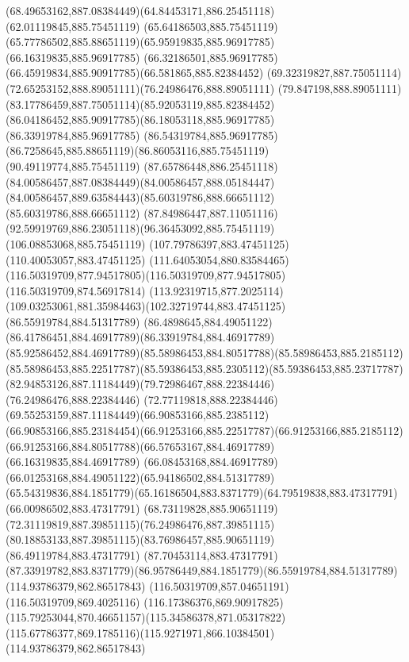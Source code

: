 {{\curveto(68.49653162,887.08384449)(64.84453171,886.25451118)(62.01119845,885.75451119)
\lineto(65.64186503,885.75451119)
\curveto(65.77786502,885.88651119)(65.95919835,885.96917785)(66.16319835,885.96917785)
\curveto(66.32186501,885.96917785)(66.45919834,885.90917785)(66.581865,885.82384452)
\curveto(69.32319827,887.75051114)(72.65253152,888.89051111)(76.24986476,888.89051111)
\curveto(79.847198,888.89051111)(83.17786459,887.75051114)(85.92053119,885.82384452)
\curveto(86.04186452,885.90917785)(86.18053118,885.96917785)(86.33919784,885.96917785)
\curveto(86.54319784,885.96917785)(86.7258645,885.88651119)(86.86053116,885.75451119)
\lineto(90.49119774,885.75451119)
\curveto(87.65786448,886.25451118)(84.00586457,887.08384449)(84.00586457,888.05184447)
\curveto(84.00586457,889.63584443)(85.60319786,888.66651112)(85.60319786,888.66651112)
\curveto(87.84986447,887.11051116)(92.59919769,886.23051118)(96.36453092,885.75451119)
\lineto(106.08853068,885.75451119)
\lineto(107.79786397,883.47451125)
\lineto(110.40053057,883.47451125)
\curveto(111.64053054,880.83584465)(116.50319709,877.94517805)(116.50319709,877.94517805)
\lineto(116.50319709,874.56917814)
\curveto(113.92319715,877.2025114)(109.03253061,881.35984463)(102.32719744,883.47451125)
\moveto(86.55919784,884.51317789)
\curveto(86.4898645,884.49051122)(86.41786451,884.46917789)(86.33919784,884.46917789)
\curveto(85.92586452,884.46917789)(85.58986453,884.80517788)(85.58986453,885.2185112)
\curveto(85.58986453,885.22517787)(85.59386453,885.2305112)(85.59386453,885.23717787)
\curveto(82.94853126,887.11184449)(79.72986467,888.22384446)(76.24986476,888.22384446)
\curveto(72.77119818,888.22384446)(69.55253159,887.11184449)(66.90853166,885.2385112)
\curveto(66.90853166,885.23184454)(66.91253166,885.22517787)(66.91253166,885.2185112)
\curveto(66.91253166,884.80517788)(66.57653167,884.46917789)(66.16319835,884.46917789)
\curveto(66.08453168,884.46917789)(66.01253168,884.49051122)(65.94186502,884.51317789)
\curveto(65.54319836,884.1851779)(65.16186504,883.8371779)(64.79519838,883.47317791)
\lineto(66.00986502,883.47317791)
\curveto(68.73119828,885.90651119)(72.31119819,887.39851115)(76.24986476,887.39851115)
\curveto(80.18853133,887.39851115)(83.76986457,885.90651119)(86.49119784,883.47317791)
\lineto(87.70453114,883.47317791)
\curveto(87.33919782,883.8371779)(86.95786449,884.1851779)(86.55919784,884.51317789)
\moveto(114.93786379,862.86517843)
\lineto(116.50319709,857.04651191)
\lineto(116.50319709,869.4025116)
\curveto(116.17386376,869.90917825)(115.79253044,870.46651157)(115.34586378,871.05317822)
\curveto(115.67786377,869.1785116)(115.9271971,866.10384501)(114.93786379,862.86517843)
}}
